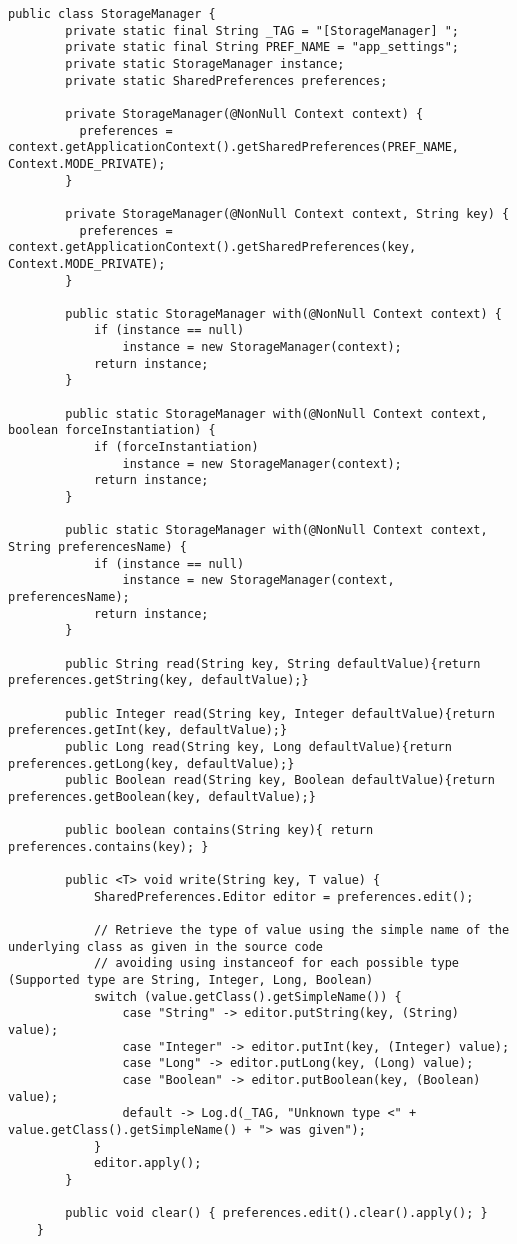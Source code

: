     \begin{lstlisting}[language={[POSIX]JAVA}, style=wnumbers]
    public class StorageManager {
        private static final String _TAG = "[StorageManager] ";
        private static final String PREF_NAME = "app_settings";
        private static StorageManager instance;
        private static SharedPreferences preferences;

        private StorageManager(@NonNull Context context) {
          preferences = context.getApplicationContext().getSharedPreferences(PREF_NAME, Context.MODE_PRIVATE);
        }

        private StorageManager(@NonNull Context context, String key) {
          preferences = context.getApplicationContext().getSharedPreferences(key, Context.MODE_PRIVATE);
        }

        public static StorageManager with(@NonNull Context context) {
            if (instance == null)
                instance = new StorageManager(context);
            return instance;
        }

        public static StorageManager with(@NonNull Context context, boolean forceInstantiation) {
            if (forceInstantiation)
                instance = new StorageManager(context);
            return instance;
        }

        public static StorageManager with(@NonNull Context context, String preferencesName) {
            if (instance == null)
                instance = new StorageManager(context, preferencesName);
            return instance;
        }

        public String read(String key, String defaultValue){return preferences.getString(key, defaultValue);}

        public Integer read(String key, Integer defaultValue){return preferences.getInt(key, defaultValue);}
        public Long read(String key, Long defaultValue){return preferences.getLong(key, defaultValue);}
        public Boolean read(String key, Boolean defaultValue){return preferences.getBoolean(key, defaultValue);}

        public boolean contains(String key){ return preferences.contains(key); }

        public <T> void write(String key, T value) {
            SharedPreferences.Editor editor = preferences.edit();

            // Retrieve the type of value using the simple name of the underlying class as given in the source code
            // avoiding using instanceof for each possible type (Supported type are String, Integer, Long, Boolean)
            switch (value.getClass().getSimpleName()) {
                case "String" -> editor.putString(key, (String) value);
                case "Integer" -> editor.putInt(key, (Integer) value);
                case "Long" -> editor.putLong(key, (Long) value);
                case "Boolean" -> editor.putBoolean(key, (Boolean) value);
                default -> Log.d(_TAG, "Unknown type <" + value.getClass().getSimpleName() + "> was given");
            }
            editor.apply();
        }

        public void clear() { preferences.edit().clear().apply(); }
    }
    \end{lstlisting}

